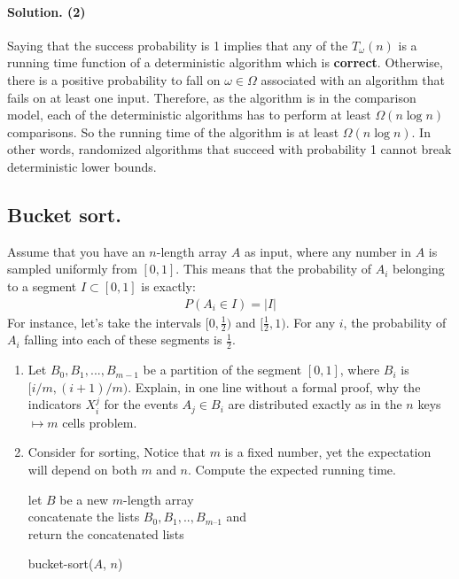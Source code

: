 \paragraph{Solution. (2)} Saying that the success probability is 1 implies that any of the $T_{\omega}(n)$ is a running time function of a deterministic algorithm which is \textbf{correct}. Otherwise, there is a positive probability to fall on $\omega \in \Omega$ associated with an algorithm that fails on at least one input. Therefore, as the algorithm is in the comparison model, each of the deterministic algorithms has to perform at least $\Omega(n\log n)$ comparisons. So the running time of the algorithm is at least $\Omega(n\log n)$. In other words, randomized algorithms that succeed with probability 1 cannot break deterministic lower bounds.


\subsection{Bucket sort.} Assume that you have an $n$-length array $A$ as input, where any number in $A$ is sampled uniformly from $[0,1]$. This means that the probability of $A_{i}$ belonging to a segment $I \subset [0,1]$ is exactly:
\begin{equation*}
  \begin{split}
    P(A_{i} \in I) = |I|
  \end{split}
\end{equation*}
For instance, let's take the intervals $[0,\frac{1}{2})$ and $[\frac{1}{2}, 1)$. For any $i$, the probability of $A_{i}$ falling into each of these segments is $\frac{1}{2}$.
\begin{enumerate}
  \item Let $B_{0}, B_{1}, ..., B_{m-1}$ be a partition of the segment $[0,1]$, where $B_{i}$ is $[i/m, (i+1)/m)$. Explain, in one line without a formal proof, why the indicators $X_{i}^{j}$ for the events $A_{j} \in B_{i}$ are distributed exactly as in the $n$ keys $\mapsto m$ cells problem.
  \item Consider  for sorting, Notice that $m$ is a fixed number, yet the expectation will depend on both $m$ and $n$. Compute the expected running time.  

\begin{algorithm}
    	let $B$ be a new $m$-length array \\
	\For{ $i \leftarrow [1, n]$}{
	    insert $A_{i}$ into list $B_{ \lfloor m A_{i} \rfloor} ]$
       	}
	concatenate the lists $B_{0}, B_{1}, .. , B_{m – 1}$ and\\
	return the concatenated lists
\caption{bucket-sort($A$, $n$)}
  \label{alg:bucket}
  \end{algorithm} 

\end{enumerate}

